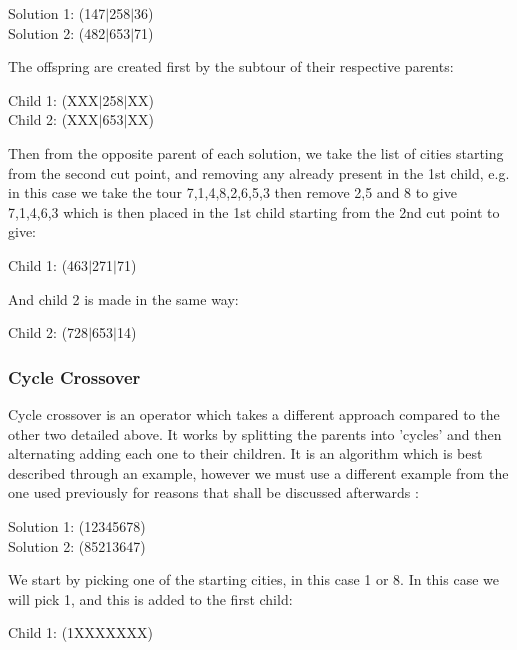 \documentclass[11pt,a4paper,titlepage]{article}
\begin{document}
\begin{center}\Large
Solution 1: (147$|$258$|$36)\\
Solution 2: (482$|$653$|$71)
\end{center}

The offspring are created first by the subtour of their respective parents:

\begin{center}\Large
Child 1: (XXX$|$258$|$XX)\\
Child 2: (XXX$|$653$|$XX)
\end{center}

Then from the opposite parent of each solution, we take the list of cities starting from the second cut point, and removing any already present in the 1st child, e.g. in this case we take the tour 7,1,4,8,2,6,5,3 then remove 2,5 and 8 to give 7,1,4,6,3 which is then placed in the 1st child starting from the 2nd cut point to give:

\begin{center}\Large
Child 1: (463$|$271$|$71)
\end{center}

And child 2 is made in the same way:

\begin{center}\Large
Child 2: (728$|$653$|$14)
\end{center}

\subsubsection{Cycle Crossover}

Cycle crossover is an operator which takes a different approach compared to the other two detailed above. It works by splitting the parents into 'cycles' and then alternating adding each one to their children. It is an algorithm which is best described through an example, however we must use a different example from the one used previously for reasons that shall be discussed afterwards \cite{GACrossover}:

\begin{center}\Large
Solution 1: (12345678)\\
Solution 2: (85213647)
\end{center}

We start by picking one of the starting cities, in this case 1 or 8. In this case we will pick 1, and this is added to the first child:

\begin{center}\Large
Child 1: (1XXXXXXX)\\
\end{center}
\end{document}
